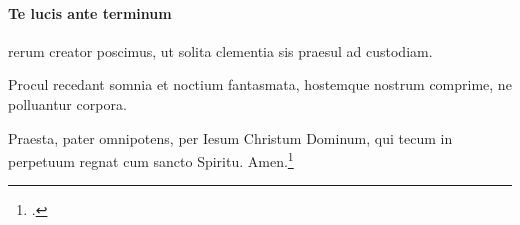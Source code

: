 
\paragraph{Te lucis ante terminum}
rerum creator poscimus,
ut solita clementia
sis praesul ad custodiam.

Procul recedant somnia
et noctium fantasmata,
hostemque nostrum comprime,
ne polluantur corpora.

Praesta, pater omnipotens,
per Iesum Christum Dominum,
qui tecum in perpetuum
regnat cum sancto Spiritu.
Amen.\footcite[53r]{bp1502}

